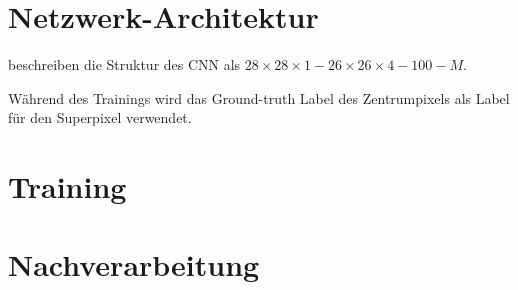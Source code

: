 \section{Netzwerk-Architektur}
\citeauthor{ChenConvolutionalNeuralNetworks2017a} beschreiben die Struktur
des CNN als \(28 \times 28 \times 1 - 26 \times 26 \times 4 - 100 - M\).

Während des Trainings wird das Ground-truth Label des Zentrumpixels als Label für den Superpixel verwendet.

\section{Training}

\section{Nachverarbeitung}